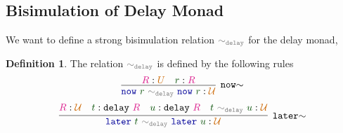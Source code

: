 \documentclass[twoside,11pt,openright]{report}
\theoremstyle{plain} %
\theoremstyle{definition}
\newtheorem{defn}{Definition}[section]
\theoremstyle{remark}
\newcommand*{\term}[1]{\textcolor{green!30!black}{#1}} %
\newcommand*{\type}[1]{\textcolor{magenta!90!black}{#1}}
\newcommand*{\universe}[1]{\textcolor{orange!80!black}{#1}}
\newcommand*{\relation}[1]{\textcolor{gray}{\ensuremath{\mathtt{#1}}}}
\newcommand*{\function}[1]{\textcolor{blue!60!black}{\ensuremath{\mathtt{#1}}}}
\newcommand*{\typeformer}[1]{\ensuremath{\mathtt{#1}}}
\begin{document}
\subsection{Bisimulation of Delay Monad}
We want to define a strong bisimulation relation \(\relation{\sim_{delay}}\) for the delay monad, 
\begin{defn}
  The relation \(\relation{\sim_{delay}}\) is defined by the following rules
  \begin{equation}
    \infer[\mathtt{now}{\sim}]{\function{now}~\term{r}~\relation{\sim_{delay}}~\function{now}~\term{r} : \universe{\mathcal{U}}}{\type{R} : \universe{U} & \term{r} : \type{R}}
  \end{equation}
  \begin{equation}
    \infer[\mathtt{later}{\sim}]{\function{later}~\term{t}~\relation{\sim_{delay}}~\function{later}~\term{u} : \universe{\mathcal{U}}}{\type{R} : \universe{\mathcal{U}} & \term{t} : \typeformer{delay}~\type{R} & \term{u} : \typeformer{delay}~\type{R} & \term{t}~\relation{\sim_{delay}}~\term{u} : \universe{\mathcal{U}}}
  \end{equation}
\end{defn}
\end{document}
